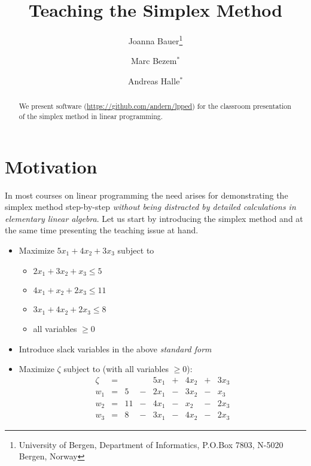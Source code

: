 \documentclass[ukenglish]{nik}
\begin{document}
\title{Teaching the Simplex Method}

\author{
Joanna Bauer\thanks{University of Bergen, Department of Informatics, P.O.Box 7803, N-5020 Bergen, Norway}
\and
Marc Bezem$^*$
\and
Andreas Halle$^*$}
\maketitle

\begin{abstract}
We present software (\url{https://github.com/andern/lpped})
for the classroom presentation of the simplex method in linear programming.
\end{abstract}

\section{Motivation}
In most courses on linear programming the need arises for demonstrating the simplex method step-by-step 
\emph{without being distracted by detailed calculations in elementary linear algebra}. Let us start by
introducing the simplex method and at the same time presenting the teaching issue at hand. 

 \begin{itemize}
    \item Maximize $5 x_1 + 4 x_2 + 3 x_3$ subject to
    \begin{itemize}
      \item $2 x_1 + 3 x_2 + x_3 \leq 5$
      \item $4 x_1 + x_2 + 2 x_3 \leq 11$
      \item $3 x_1 + 4 x_2 + 2 x_3 \leq 8$
      \item all variables $\geq 0$
    \end{itemize}
    \item Introduce slack variables in the above \emph{standard form}
    \item Maximize $\zeta$ subject to (with all variables $\geq 0$):
\[    
    \begin{array}{lcrcrcrcr}
      \zeta&=&   & & 5 x_1 &+& 4 x_2 &+& 3 x_3 \\\hline
      w_1  &=& 5 &-& 2 x_1 &-& 3 x_2 &-&   x_3 \\
      w_2  &=& 11&-& 4 x_1 &-&   x_2 &-& 2 x_3 \\
      w_3  &=& 8 &-& 3 x_1 &-& 4 x_2 &-& 2 x_3 
    \end{array}
\]
  \end{itemize}
\end{document}

